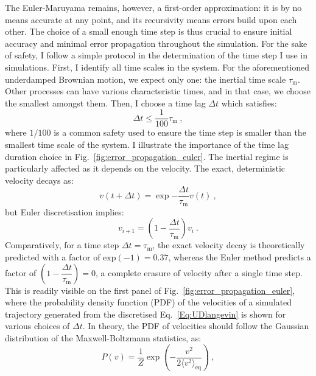 The Euler-Maruyama remains, however, a first-order approximation: it is by no means accurate at any point, and its recursivity means errors build upon each other. The choice of a small enough time step is thus crucial to ensure initial accuracy and minimal error propagation throughout the simulation. For the sake of safety, I follow a simple protocol in the determination of the time step I use in simulations. First, I identify all time scales in the system. For the aforementioned underdamped Brownian motion, we expect only one: the inertial time scale $\tau_\mathrm{m}$. Other processes can have various characteristic times, and in that case, we choose the smallest amongst them. Then, I choose a time lag $\Delta t$ which satisfies:
\begin{equation}
    \Delta t \leq \dfrac{1}{100}\tau_\mathrm{m}~,
\end{equation}
where $1/100$ is a common safety used to ensure the time step is smaller than the smallest time scale of the system. I illustrate the importance of the time lag duration choice in Fig.~\ref{fig:error_propagation_euler}. The inertial regime is particularly affected as it depends on the velocity. The exact, deterministic velocity decays as:
\begin{equation}
    v(t + \Delta t) = \exp{-\dfrac{\Delta t}{\tau_\mathrm{m}}}v(t)~,
\end{equation}
but Euler discretisation implies:
\begin{equation}
    v_{i+1} = \left( 1 - \dfrac{\Delta t}{\tau_\mathrm{m}}\right)v_i~.
\end{equation}
Comparatively, for a time step $\Delta t = \tau_\mathrm{m}$, the exact velocity decay is theoretically predicted with a factor of $\mathrm{exp}(-1) = 0.37$, whereas the Euler method predicts a factor of $\left(1 - \dfrac{\Delta t}{\tau_\mathrm{m}}\right) = 0$, a complete erasure of velocity after a single time step. This is readily visible on the first panel of Fig.~\ref{fig:error_propagation_euler}, where the probability density function (PDF) of the velocities of a simulated trajectory generated from the discretised Eq.~\ref{Eq:UDlangevin} is shown for various choices of $\Delta t$. In theory, the PDF of velocities should follow the Gaussian distribution of the Maxwell-Boltzmann statistics, as:
\begin{equation}
    P(v) = \dfrac{1}{Z} \exp \left( - \dfrac{v^2}{2\langle v^2 \rangle_\mathrm{eq}} \right)~,
    \label{velocity_maxwellian}
\end{equation}
